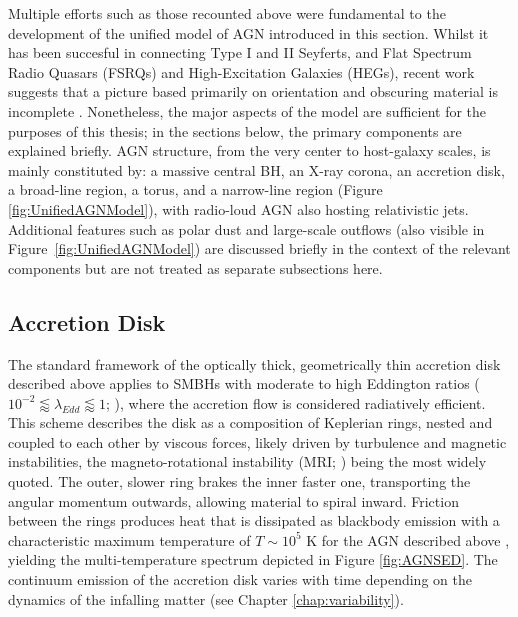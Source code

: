 Multiple efforts such as those recounted above  \parencites{Antonucci1984SpecPolarimOtherGalax}{OrrBrowne1982AGNBeaming} were fundamental to the development of the  unified model of AGN \parencites{Antonucci1993UnifiedAGN}{UrryPadovani1995UnifiedAGN} introduced in this section. Whilst it has been succesful in connecting Type I and II Seyferts, and Flat Spectrum Radio Quasars (FSRQs) and High-Excitation Galaxies (HEGs), recent work suggests that a picture based primarily on orientation and obscuring material is incomplete \parencites{Netzer2015AnnRev}{Padovani2017whatisaname}. Nonetheless, the major aspects of the model are sufficient for the purposes of this thesis; in the sections below, the primary components are explained briefly. AGN structure, from the very center to host-galaxy scales, is mainly constituted by: a massive central BH, an X-ray corona, an accretion disk, a broad-line region, a torus, and a narrow-line region (Figure \ref{fig:UnifiedAGNModel}), with radio-loud AGN also hosting relativistic jets. Additional features such as polar dust and large-scale outflows (also visible in Figure~\ref{fig:UnifiedAGNModel}) are discussed briefly in the context of the relevant components but are not treated as separate subsections here.

\subsection{Accretion Disk}
\label{ssec:AccretionDisk}

The standard framework of the optically thick, geometrically thin accretion disk \parencite{ShakuraSunyaev1973BHAppearance} described above applies to SMBHs with moderate to high Eddington ratios ($10^{-2} \lessapprox \lambda_{Edd} \lessapprox 1$; \cite{Ricci2026unificationmodelsactivegalactic}), where the accretion flow is considered radiatively efficient. This scheme describes the disk as a composition of Keplerian rings, nested and coupled to each other by viscous forces, likely driven by turbulence and magnetic instabilities, the magneto-rotational instability (MRI; \cite{Balbus1998TurbulenceAccretionD}) being the most widely quoted. The outer, slower ring brakes the inner faster one, transporting the angular momentum outwards, allowing material to spiral inward. Friction between the rings produces heat that is dissipated as blackbody emission with a characteristic maximum temperature of $T \sim 10^5$ K for the  AGN described above \parencite{Netzer2013PhyEvolofAGNBook}, yielding the multi-temperature spectrum depicted in Figure \ref{fig:AGNSED}. The continuum emission of the accretion disk varies with time depending on the dynamics of the infalling matter (see Chapter \ref{chap:variability}).

